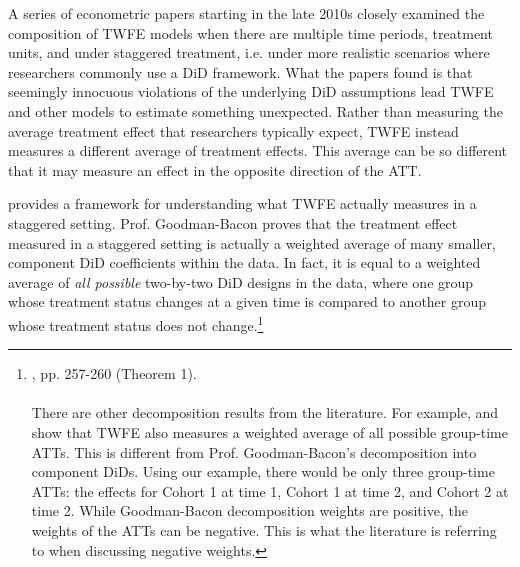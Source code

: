 \documentclass[12pt]{article}
\begin{document}
A series of econometric papers starting in the late 2010s closely examined the composition of TWFE models when there are multiple time periods, treatment units, and under staggered treatment, i.e. under more realistic scenarios where researchers commonly use a DiD framework. What the papers found is that seemingly innocuous violations of the underlying DiD assumptions lead TWFE and other models to estimate something unexpected. Rather than measuring the average treatment effect that researchers typically expect, TWFE instead measures a different average of treatment effects. This average can be so different that it may measure an effect in the opposite direction of the ATT.

\citet{goodman-bacon2021a} provides a framework for understanding what TWFE actually measures in a staggered setting. Prof. Goodman-Bacon proves that the treatment effect measured in a staggered setting is actually a weighted average of many smaller, component DiD coefficients within the data. In fact, it is equal to a weighted average of \textit{all possible} two-by-two DiD designs in the data, where one group whose treatment status changes at a given time is compared to another group whose treatment status does not change.\footnote{\citet{goodman-bacon2021a}, pp. 257-260 (Theorem 1).
\\\\
There are other decomposition results from the literature. For example, \citet{de2020two} and \citet{borusyak2024revisiting} show that TWFE also measures a weighted average of all possible group-time ATTs. This is different from Prof. Goodman-Bacon's decomposition into component DiDs. Using our example, there would be only three group-time ATTs: the effects for Cohort 1 at time 1, Cohort 1 at time 2, and Cohort 2 at time 2. While Goodman-Bacon decomposition weights are positive, the weights of the ATTs can be negative. This is what the literature is referring to when discussing negative weights. 
}
\end{document}
